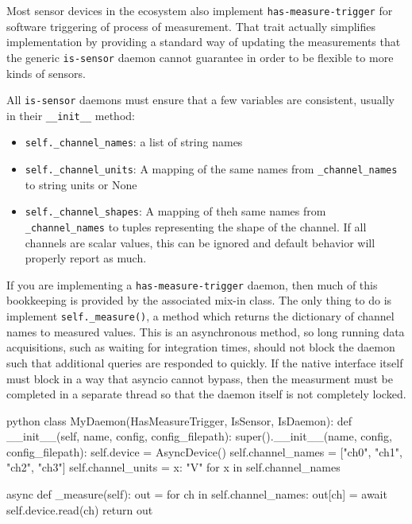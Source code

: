 Most sensor devices in the \yaq{} ecosystem also implement \texttt{has-measure-trigger} for software triggering of process of measurement.
That trait actually simplifies implementation by providing a standard way of updating the measurements that the generic \texttt{is-sensor} daemon cannot guarantee in order to be flexible to more kinds of sensors.

All \texttt{is-sensor} daemons must ensure that a few variables are consistent, usually in their \texttt{\_\_init\_\_} method:

\begin{itemize}
\item \texttt{self.\_channel\_names}: a list of string names
\item \texttt{self.\_channel\_units}: A mapping of the same names from \texttt{\_channel\_names} to string units or None
\item \texttt{self.\_channel\_shapes}: A mapping of theh same names from \texttt{\_channel\_names} to tuples representing the shape of the channel. If all channels are scalar values, this can be ignored and default behavior will properly report as much.
\end{itemize}

If you are implementing a \texttt{has-measure-trigger} daemon, then much of this bookkeeping is provided by the associated mix-in class.
The only thing to do is implement \texttt{self.\_measure()}, a method which returns the dictionary of channel names to measured values.
This is an asynchronous method, so long running data acquisitions, such as waiting for integration times, should not block the daemon such that additional queries are responded to quickly.
If the native interface itself must block in a way that asyncio cannot bypass, then the measurment must be completed in a separate thread so that the daemon itself is not completely locked.

\begin{codefragment}{python}
class MyDaemon(HasMeasureTrigger, IsSensor, IsDaemon):
    def __init__(self, name, config, config_filepath):
        super().__init__(name, config, config_filepath):
        self.device = AsyncDevice()
        self.channel_names = ["ch0", "ch1", "ch2", "ch3"]
        self.channel_units = {x: "V" for x in self.channel_names}

    async def _measure(self):
        out = {}
        for ch in self.channel_names:
            out[ch] = await self.device.read(ch)
        return out
\end{codefragment}

